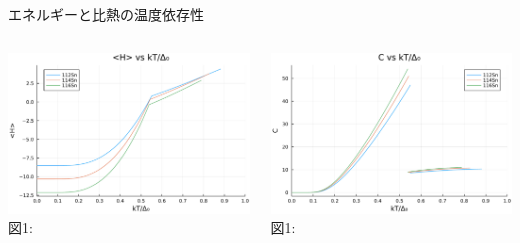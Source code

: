 \documentclass[aspectratio=169, 12pt, dvipdfmx]{beamer}
\begin{document}
\begin{frame}{エネルギーと比熱の温度依存性}
  \begin{columns}[totalwidth=1.0\linewidth]
    \begin{column}[T]{0.5\linewidth}
      \centering
      \includegraphics[width=\textwidth]{fig_pdf/Comp_FT_H.pdf}
      \vspace{5pt} %
      \scriptsize 図1:
    \end{column}

  \begin{column}[T]{0.5\linewidth}
    \centering
    \includegraphics[width=\textwidth]{fig_pdf/Comp_FT_C.pdf}
    \vspace{5pt} %
    \scriptsize 図1:
  \end{column}
  \end{columns}
\end{frame}
\end{document}
